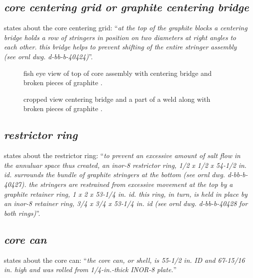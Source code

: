 \documentclass[ms,a4paper]{memoir}
\newcommand*{\mrsarchive}{../../msr-archive}%
\begin{document}

\subsection{\emph{core centering grid or graphite centering bridge}}
\parencite[page 84-85]{ornl-tm-0728} states about the core centering grid:
\enquote{\textit{at the top of the graphite blocks a centering bridge holds a row of stringers in position on two diameters at right angles to each other. this bridge helps to prevent shifting of the entire stringer assembly (see ornl dwg. d-bb-b-40424)}}.
\begin{figure}[H]
  \centering
  \centering
  \caption{fish eye view of top of core assembly with centering bridge and broken pieces of graphite \parencite[figure 1.5]{ornl-4676}.}
  \label{4676-fig1-5}
\end{figure}

\begin{figure}[H]
  \centering
  \centering
  \caption{cropped view centering bridge and a part of a weld along with broken pieces of graphite \parencite[figure 1.4]{ornl-4676}.}
  \label{4676-fig1-4}
\end{figure}

\subsection{\emph{restrictor ring}}
\parencite[page 84-85]{ornl-tm-0728} states about the restrictor ring:
\enquote{\textit{to prevent an excessive amount of salt flow in the annuluar space thus created, an inor-8 restrictor ring, 1/2 x 1/2 x 54-1/2 in. id. surrounds the bundle of graphite stringers at the bottom (see ornl dwg. d-bb-b-40427). the stringers are restrained from excessive movement at the top by a graphite retainer ring, 1 x 2 x 53-1/4 in. id. this ring, in turn, is held in place by an inor-8 retainer ring, 3/4 x 3/4 x 53-1/4 in. id (see ornl dwg. d-bb-b-40428 for both rings)}}.

\subsection{\emph{core can}}
\parencite[page 79]{ornl-tm-0728} states about the core can:
\enquote{\textit{the core can, or shell, is 55-1/2 in. ID and 67-15/16 in. high and was rolled from 1/4-in.-thick INOR-8 plate.}}
\end{document}
